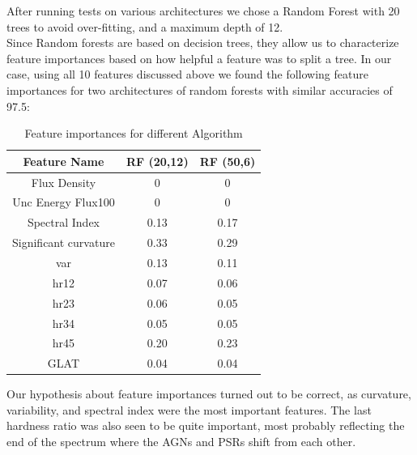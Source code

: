 After running tests on various architectures we chose a Random Forest with 20 trees to avoid over-fitting, and a maximum depth of 12. \\

Since Random forests are based on decision trees, they allow us to characterize feature importances based on how helpful a feature was to split a tree. In our case, using all 10 features discussed above we found the following feature importances for two architectures of random forests with similar accuracies of 97.5:\\


\begin{table}[!h]
    \tiny
    \centering
    \renewcommand{\tabcolsep}{1mm}
\renewcommand{\arraystretch}{1}

    \begin{tabular}{|c|c|c|}
    \hline
    Feature Name&  RF (20,12)& RF (50,6)\\
    \hline
    Flux Density& 0 & 0        \\
    \hline
    Unc Energy Flux100& 0     & 0 \\
    \hline %
   Spectral Index & 0.13     &   0.17 \\
    \hline %
    Significant curvature& 0.33 &0.29  \\
    \hline
   var&  0.13   &  0.11  \\
    \hline %
    hr12& 0.07 &0.06 \\
    \hline
     hr23& 0.06 &0.05 \\
    \hline
    hr34& 0.05 &0.05 \\
    \hline
   hr45& 0.20 &0.23 \\
    \hline
    GLAT&0.04&0.04\\
    \hline
    \end{tabular}

    \caption{Feature importances for different Algorithm}
    \label{tab:feat_imp}
\end{table}

Our hypothesis about feature importances turned out to be correct, as curvature, variability, and spectral index were the most important features. The last hardness ratio was also seen to be quite important, most probably reflecting the end of the spectrum where the AGNs and PSRs shift from each other.\\

